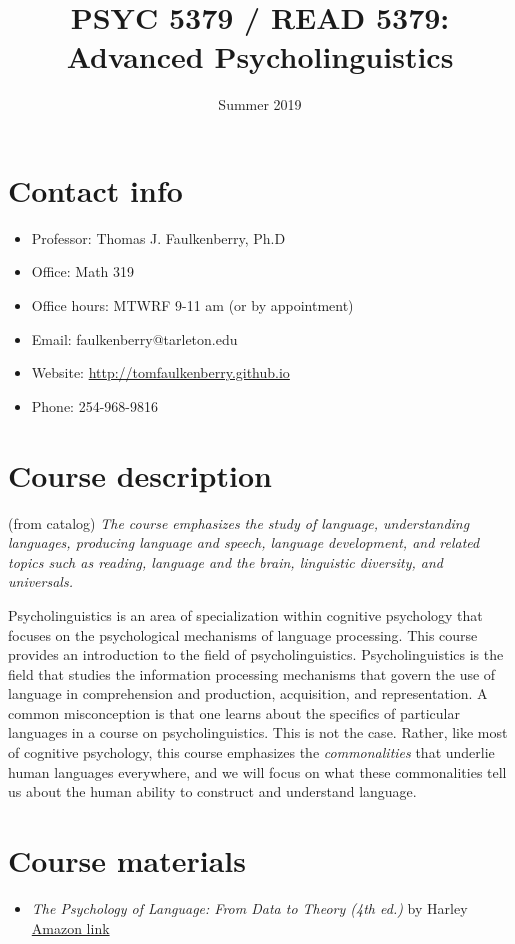 \documentclass[10pt]{article}
\date{Summer 2019}
\title{PSYC 5379 / READ 5379: Advanced Psycholinguistics}
\begin{document}
\maketitle

\section*{Contact info}
\label{sec:org545b521}
\begin{itemize}
\item Professor: Thomas J. Faulkenberry, Ph.D
\item Office: Math 319
\item Office hours: MTWRF 9-11 am (or by appointment)
\item Email: faulkenberry@tarleton.edu
\item Website: \url{http://tomfaulkenberry.github.io}
\item Phone: 254-968-9816
\end{itemize}

\section*{Course description}
\label{sec:orgbc9dbd2}

(from catalog) \emph{The course emphasizes the study of language, understanding languages, producing language and speech, language development, and related topics such as reading, language and the brain, linguistic diversity, and universals.}

Psycholinguistics is an area of specialization within cognitive psychology that focuses on the psychological mechanisms of language processing.  This course provides an introduction to the field of psycholinguistics. Psycholinguistics is the field that studies the information processing mechanisms that govern the use of language in comprehension and production, acquisition, and representation.  A common misconception is that one learns about the specifics of particular languages in a course on psycholinguistics.  This is not the case.  Rather, like most of cognitive psychology, this course emphasizes the \emph{commonalities} that underlie human languages everywhere, and we will focus on what these commonalities tell us about the human ability to construct and understand language. 

\section*{Course materials}
\label{sec:orge83d01a}
\begin{itemize}
\item \emph{The Psychology of Language: From Data to Theory (4th ed.)} by Harley \href{https://www.amazon.com/Psychology-Language-Data-Theory/dp/1848720890}{Amazon link}
\end{itemize}
\end{document}
